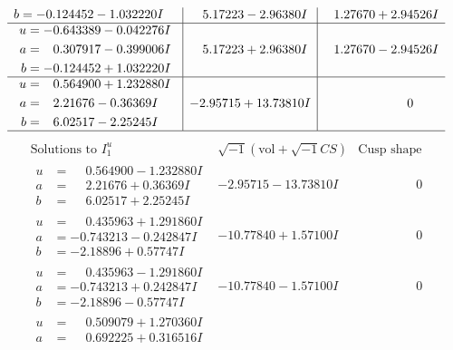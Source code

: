 \documentclass[1p]{elsarticle_modified}
\theoremstyle{definition}
\newcommand{\I}{\sqrt{-1}}
\begin{document}
$$\begin{array}{c|c|c}
\begin{aligned}
b &= -0.124452 - 1.032220 I\end{aligned}
 & \phantom{-}5.17223 - 2.96380 I & \phantom{-}1.27670 + 2.94526 I \\ \hline\begin{aligned}
u &= -0.643389 - 0.042276 I \\
a &= \phantom{-}0.307917 - 0.399006 I \\
b &= -0.124452 + 1.032220 I\end{aligned}
 & \phantom{-}5.17223 + 2.96380 I & \phantom{-}1.27670 - 2.94526 I \\ \hline\begin{aligned}
u &= \phantom{-}0.564900 + 1.232880 I \\
a &= \phantom{-}2.21676 - 0.36369 I \\
b &= \phantom{-}6.02517 - 2.25245 I\end{aligned}
 & -2.95715 + 13.73810 I & \phantom{-0.000000 } 0\\
 \hline 
 \end{array}$$\newpage$$\begin{array}{c|c|c}  
\text{Solutions to }I^u_{1}& \I (\text{vol} + \sqrt{-1}CS) & \text{Cusp shape}\\
 \hline 
\begin{aligned}
u &= \phantom{-}0.564900 - 1.232880 I \\
a &= \phantom{-}2.21676 + 0.36369 I \\
b &= \phantom{-}6.02517 + 2.25245 I\end{aligned}
 & -2.95715 - 13.73810 I & \phantom{-0.000000 } 0 \\ \hline\begin{aligned}
u &= \phantom{-}0.435963 + 1.291860 I \\
a &= -0.743213 - 0.242847 I \\
b &= -2.18896 + 0.57747 I\end{aligned}
 & -10.77840 + 1.57100 I & \phantom{-0.000000 } 0 \\ \hline\begin{aligned}
u &= \phantom{-}0.435963 - 1.291860 I \\
a &= -0.743213 + 0.242847 I \\
b &= -2.18896 - 0.57747 I\end{aligned}
 & -10.77840 - 1.57100 I & \phantom{-0.000000 } 0 \\ \hline\begin{aligned}
u &= \phantom{-}0.509079 + 1.270360 I \\
a &= \phantom{-}0.692225 + 0.316516 I \\

\end{aligned}
\end{array}$$
\end{document}
